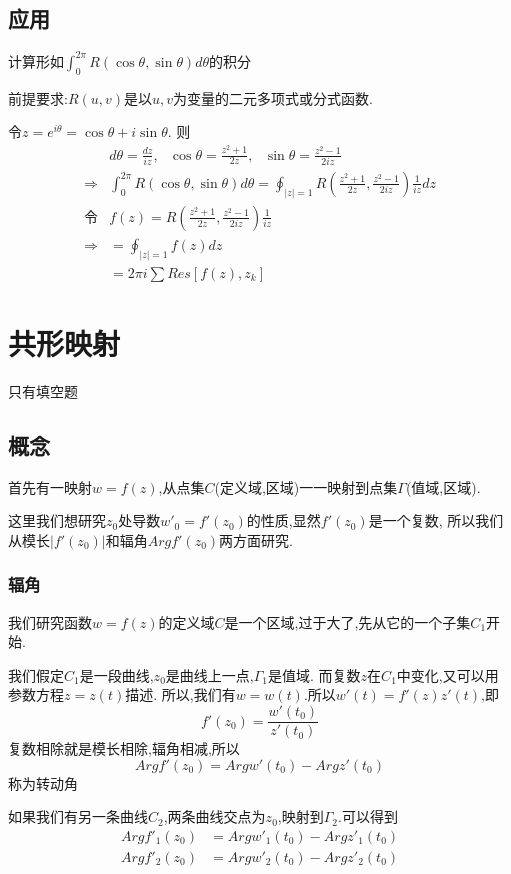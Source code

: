 \documentclass[12pt, a4paper, oneside]{ctexart}
\begin{document}
\subsection{应用}
计算形如$\int_{0}^{2\pi}R(\cos \theta,\sin \theta)d\theta$的积分

前提要求:$R(u,v)$是以$u,v$为变量的二元多项式或分式函数.

令$z = e^{i\theta} = \cos \theta + i\sin \theta$.
则
\begin{align*}
    &d\theta = \frac{dz}{iz},\text{ }
    \cos \theta = \frac{z^2+1}{2z},\text{ }
    \sin \theta = \frac{z^2-1}{2iz}\\
    \Rightarrow&\int_{0}^{2\pi}R(\cos\theta,\sin\theta)d\theta = 
    \oint_{|z|=1}R(\frac{z^2+1}{2z},\frac{z^2-1}{2iz})\frac{1}{iz}dz\\
    \text{令}&f(z) = R(\frac{z^2+1}{2z},\frac{z^2-1}{2iz})\frac{1}{iz}\\
    \Rightarrow &= \oint_{|z|=1}f(z)dz\\
    &= 2\pi i \sum Res[f(z),z_k]
\end{align*}
\section{共形映射}
只有填空题
\subsection{概念}
首先有一映射$w=f(z)$,从点集$C$(定义域,区域)一一映射到点集$\Gamma$(值域,区域).

这里我们想研究$z_0$处导数$w'_0=f'(z_0)$的性质,显然$f'(z_0)$是一个复数,
所以我们从模长$|f'(z_0)|$和辐角$Arg f'(z_0)$两方面研究.
\subsubsection{辐角}
我们研究函数$w=f(z)$的定义域$C$是一个区域,过于大了,先从它的一个子集$C_1$开始.

我们假定$C_1$是一段曲线,$z_0$是曲线上一点,$\Gamma_1$是值域.
而复数$z$在$C_1$中变化,又可以用参数方程$z=z(t)$描述.
所以,我们有$w=w(t)$.所以$w'(t)=f'(z)z'(t)$,即
\[
    f'(z_0) = \frac{w'(t_0)}{z'(t_0)}
\]
复数相除就是模长相除,辐角相减,所以
\[
    Arg f'(z_0) = Arg w'(t_0) - Arg z'(t_0)
\]
称为转动角

如果我们有另一条曲线$C_2$,两条曲线交点为$z_0$,映射到$\Gamma_2$.可以得到
\begin{align*}
    Arg f'_1(z_0) &= Arg w'_1(t_0) - Arg z'_1(t_0)\\
    Arg f'_2(z_0) &= Arg w'_2(t_0) - Arg z'_2(t_0)
\end{align*}
\end{document}
